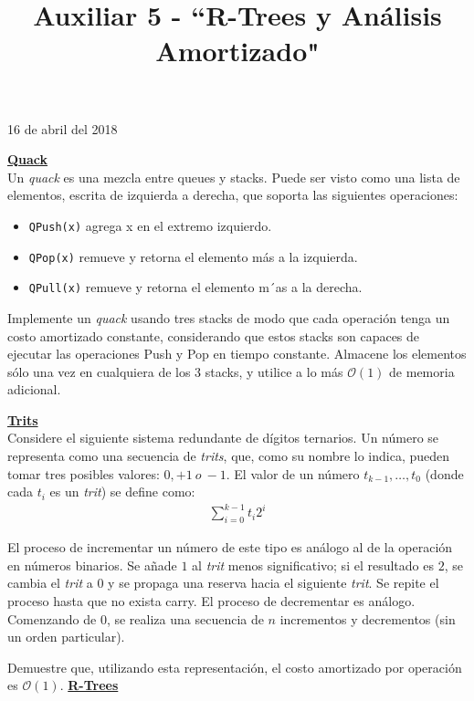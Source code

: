 \documentclass[dcc,uchile]{fcfmcourse}
\title{Auxiliar 5 - ``R-Trees y Análisis Amortizado"}
\theoremstyle{plain}
\theoremstyle{definition}
\begin{document}
\maketitle
\begin{center}
16 de abril del 2018
\end{center}


\vspace{-1ex}


\begin{problems}
\problem \underline{\textbf{Quack}}\\
 Un \textit{quack} es una mezcla entre queues y stacks. Puede ser visto como una lista de elementos,
escrita de izquierda a derecha, que soporta las siguientes operaciones:
\begin{itemize}
    \item \texttt{QPush(x)} agrega x en el extremo izquierdo.
    \item \texttt{QPop(x)} remueve y retorna el elemento más a la izquierda.
    \item \texttt{QPull(x)} remueve y retorna el elemento m´as a la derecha.
\end{itemize}

Implemente un \textit{quack} usando tres stacks de modo que cada operación tenga un costo amortizado
constante, considerando que estos stacks son capaces de ejecutar las operaciones Push y Pop en tiempo constante. Almacene los elementos sólo una vez en cualquiera de los 3 stacks, y utilice a lo más $\mathcal{O}(1)$ de memoria adicional.

\problem \underline{\textbf{Trits}}\\
 Considere el siguiente sistema redundante de dígitos ternarios.
Un número se representa como una secuencia de \textit{trits}, que, como su nombre lo indica, pueden tomar tres posibles valores: $0, +1\ o\ −1$. El valor de un número $t_{k−1}, \ldots, t_0$ (donde cada $t_i$ es un \textit{trit}) se define como:
\begin{align*}
    \sum_{i=0}^{k-1} t_{i}2^i
\end{align*}

El proceso de incrementar un número de este tipo es análogo al de la operación en números binarios. Se añade $1$ al \textit{trit} menos significativo; si el resultado es $2$, se cambia
el \textit{trit} a $0$ y se propaga una reserva hacia el siguiente \textit{trit}. Se repite el proceso hasta que no exista carry.
El proceso de decrementar es análogo. Comenzando de $0$, se realiza una secuencia de $n$ incrementos y decrementos (sin un orden particular).\ 

Demuestre que, utilizando esta representación, el costo amortizado por operación es $\mathcal{O}(1)$.
\problem \underline{\textbf{R-Trees}}

\end{problems}
\end{document}
